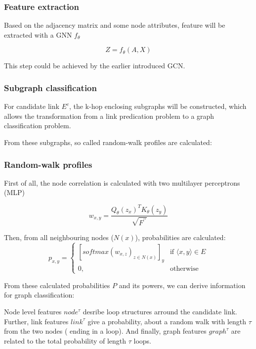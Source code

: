 \subsubsection{Feature extraction}
Based on the adjacency matrix and some node attributes, 
feature will be extracted with a GNN $f_{\theta}$

\begin{equation}
    Z = f_{\theta} (A,X)
\end{equation}

This step could be achieved by the earlier introduced GCN.

\subsubsection{Subgraph classification}

For candidate link $E^c$, the k-hop enclosing subgraphs
 will be constructed, which allows the transformation
from a link predication problem to a graph classification problem.


From these subgraphs, so called random-walk profiles are calculated:

\subsubsection{Random-walk profiles}

First of all, the node correlation is calculated with two multilayer perceptrons (MLP)

\begin{equation}
    w_{x,y} = \frac{Q_{\theta}(z_x)^T K_{\theta}(z_y)}{\sqrt{F^{\prime\prime}}}
\end{equation}

Then, from all neighbouring nodes ($N(x)$), probabilities are calculated:
\begin{equation}
    p_{x,y} = 
    \begin{cases}
            [softmax(w_{x,z})_{z \in N(x)}]_y  & \text{if } \langle x , y \rangle \in E \\
            0, & \text{otherwise}
    \end{cases}
\end{equation}

From these calculated probabilities $P$ and its powers, we can derive information for 
graph classification:

Node level features $node^{\tau}$ desribe loop structures arround the candidate link.
Further, link features $link^{\tau}$ give a probability, about a random walk with length
$\tau$ from the two nodes ( ending in a loop). And finally, graph features $graph^{\tau}$ are related to the total
probability of length $\tau$ loops.

